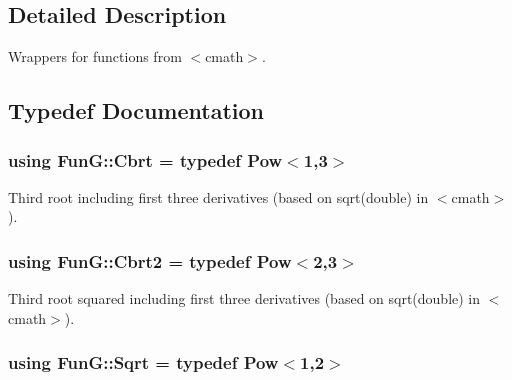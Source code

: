 \subsection{Detailed Description}
Wrappers for functions from $<$cmath$>$. 



\subsection{Typedef Documentation}
\subsubsection[{\texorpdfstring{Cbrt}{Cbrt}}]{\setlength{\rightskip}{0pt plus 5cm}using {\bf Fun\+G\+::\+Cbrt} = typedef Pow$<$1,3$>$}\hypertarget{group__CMathGroup_ga2e4363ad8400e1c8431c10de2152ec2b}{}\label{group__CMathGroup_ga2e4363ad8400e1c8431c10de2152ec2b}


Third root including first three derivatives (based on sqrt(double) in $<$cmath$>$). 

\subsubsection[{\texorpdfstring{Cbrt2}{Cbrt2}}]{\setlength{\rightskip}{0pt plus 5cm}using {\bf Fun\+G\+::\+Cbrt2} = typedef Pow$<$2,3$>$}\hypertarget{group__CMathGroup_ga9bcbef859d7ffd0d6570d69e1bd8503a}{}\label{group__CMathGroup_ga9bcbef859d7ffd0d6570d69e1bd8503a}


Third root squared including first three derivatives (based on sqrt(double) in $<$cmath$>$). 

\subsubsection[{\texorpdfstring{Sqrt}{Sqrt}}]{\setlength{\rightskip}{0pt plus 5cm}using {\bf Fun\+G\+::\+Sqrt} = typedef Pow$<$1,2$>$}\hypertarget{group__CMathGroup_gaca80e773d5886f47cd49dc19b130263f}{}\label{group__CMathGroup_gaca80e773d5886f47cd49dc19b130263f}


